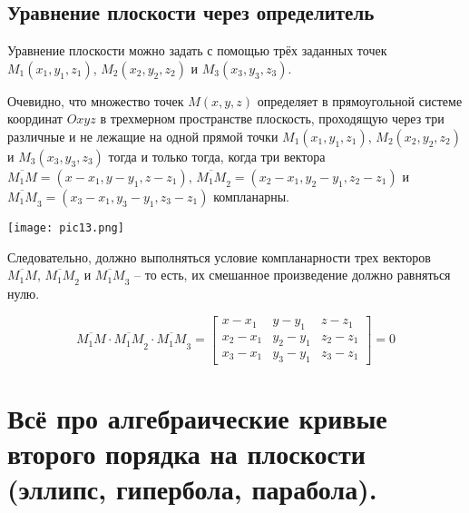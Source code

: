 \documentclass{article}
\begin{document}
\newpage
\subsection{Уравнение плоскости через определитель}
Уравнение плоскости можно задать с помощью трёх заданных точек $M_1(x_1,y_1,z_1)$, $M_2(x_2,y_2,z_2)$ и $M_3(x_3,y_3,z_3)$.

Очевидно, что множество точек $M(x,y,z)$ определяет в прямоугольной системе координат $Oxyz$ в трехмерном пространстве плоскость, проходящую через три различные и не лежащие на одной прямой точки $M_1(x_1,y_1,z_1)$, $M_2(x_2,y_2,z_2)$ и $M_3(x_3,y_3,z_3)$ тогда и только тогда, когда три вектора $\overline{M_1M}=(x-x_1,y-y_1,z-z_1)$, $\overline{M_1M}_2=(x_2-x_1,y_2-y_1,z_2-z_1)$ и $\overline{M_1M}_3=(x_3-x_1,y_3-y_1,z_3-z_1)$ компланарны.
\begin{center}
    \texttt{[image: pic13.png]}
\end{center}
Следовательно, должно выполняться условие компланарности трех векторов $\overline{M_1M}$, $\overline{M_1M}_2$ и $\overline{M_1M}_3$ -- то есть, их смешанное произведение должно равняться нулю.

\[
    \overline{M_1M}\cdot\overline{M_1M}_2\cdot\overline{M_1M}_3
    =
    \begin{bmatrix}
    x-x_1 & y-y_1 & z-z_1 \\
    x_2-x_1 & y_2-y_1 & z_2-z_1 \\
    x_3-x_1 & y_3-y_1 & z_3-z_1
    \end{bmatrix}
    = 0
    \]
\newpage
\section{Всё про алгебраические кривые второго порядка на плоскости (эллипс, гипербола, парабола).}
\end{document}
